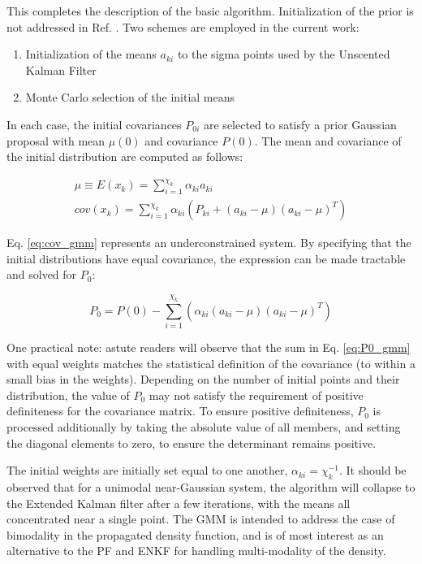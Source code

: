 \documentclass[]{article}
\begin{document}
This completes the description of the basic algorithm. Initialization of the prior is not addressed in Ref. \cite{alspach}. Two schemes are employed in the current work:

\begin{enumerate}
\item Initialization of the means $a_{ki}$ to the sigma points used by the Unscented Kalman Filter
\item Monte Carlo selection of the initial means
\end{enumerate}

In each case, the initial covariances $P_{0i}$ are selected to satisfy a prior Gaussian proposal with mean $\mu(0)$ and covariance $P(0)$. The mean and covariance of the initial distribution are computed as follows:

\begin{align}
\mu \equiv E(x_k) = \sum_{i=1}^{\chi_k} \alpha_{ki} a_{ki} \\
cov(x_k) = \sum_{i=1}^{\chi_k} \alpha_{ki} (P_{ki} + (a_{ki}-\mu)(a_{ki}-\mu)^T) \label{eq:cov_gmm}
\end{align}

Eq. \ref{eq:cov_gmm} represents an underconstrained system. By specifying that the initial distributions have equal covariance, the expression can be made tractable and solved for $P_{0}$:

\begin{equation}
P_{0} = P(0) - \sum_{i=1}^{\chi_k} (\alpha_{ki}(a_{ki}-\mu)(a_{ki}-\mu)^T)
\label{eq:P0_gmm}
\end{equation}

One practical note: astute readers will observe that the sum in Eq. \ref{eq:P0_gmm} with equal weights matches the statistical definition of the covariance (to within a small bias in the weights). Depending on the number of initial points and their distribution, the value of $P_{0}$ may not satisfy the requirement of positive definiteness for the covariance matrix. To ensure positive definiteness, $P_{0}$ is processed additionally by taking the absolute value of all members, and setting the diagonal elements to zero, to ensure the determinant remains positive.

The initial weights are initially set equal to one another, $\alpha_{ki} = \chi_k^{-1}$. It should be observed that for a unimodal near-Gaussian system, the algorithm will collapse to the Extended Kalman filter after a few iterations, with the means all concentrated near a single point. The GMM is intended to address the case of bimodality in the propagated density function, and is of most interest as an alternative to the PF and ENKF for handling multi-modality of the density.



\end{document}
